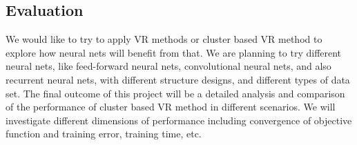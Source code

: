 \documentclass{article} %
\begin{document}
\subsection{Evaluation}
We would like to try to apply VR methods or cluster based VR method to explore how neural nets will benefit from that. We are planning to try different neural nets, like feed-forward neural nets, convolutional neural nets, and also recurrent neural nets, with different structure designs, and different types of data set. The final outcome of this project will be a detailed analysis and comparison of the performance of cluster based VR method in different scenarios. We will investigate different dimensions of performance including convergence of objective function and training error, training time, etc. 






\end{document}
